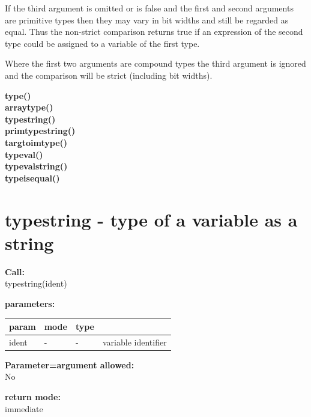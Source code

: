         If the third argument is omitted or is false and the first and second
        arguments are primitive types then they may vary in bit widths and still
        be regarded as equal. Thus the non-strict comparison returns true if an
        expression of the second type could be assigned to a variable of the
        first type.
        
        Where the first two arguments are compound types the third argument
        is ignored and the comparison will be strict (including bit widths).
        
        
        {\bf type()}  \\
        {\bf arraytype()}  \\
        {\bf typestring()}  \\
        {\bf primtypestring()}  \\
        {\bf targtoimtype()}  \\
        {\bf typeval()}  \\
        {\bf typevalstring()}  \\
        {\bf typeisequal()}  \\


    \section{typestring - type of a variable as a string}\label{sec:iftypestring}
        
        {\bf Call:} \\
        typestring(ident)
        
        {\bf parameters:} \\
        \begin{tabular}{| l | l | l | l |}
        \hline
        param  & mode & type & \\
        \hline \hline
        ident & - &  -  & variable identifier \\ \hline
        \end{tabular}
        
        {\bf Parameter=argument allowed:} \\
        No
        
        {\bf return mode:} \\
        immediate

